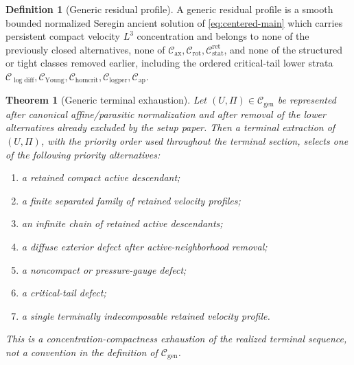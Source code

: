 \documentclass[11pt]{amsart}
\numberwithin{equation}{section}
\theoremstyle{plain}
\newtheorem{theorem}{Theorem}[section]
\theoremstyle{definition}
\newtheorem{definition}[definition]{Definition}
\theoremstyle{remark}
\newcommand{\Cax}{\mathcal C_{\mathrm{ax}}}
\newcommand{\Crot}{\mathcal C_{\mathrm{rot}}}
\newcommand{\Cstat}{\mathcal C_{\mathrm{stat}}^{\mathrm{ret}}}
\newcommand{\Cgen}{\mathcal C_{\mathrm{gen}}}
\newcommand{\Chomcrit}{\mathcal C_{\mathrm{homcrit}}}
\newcommand{\Clogper}{\mathcal C_{\mathrm{logper}}}
\newcommand{\Capcrit}{\mathcal C_{\mathrm{ap}}}
\newcommand{\Cyoung}{\mathcal C_{\mathrm{Young}}}
\newcommand{\Clogdiff}{\mathcal C_{\log\mathrm{diff}}}
\begin{document}
\begin{definition}[Generic residual profile]
\label{def:R4-profile-main}
A generic residual profile is a smooth bounded normalized Seregin ancient solution of
\eqref{eq:centered-main} which carries persistent compact velocity
\(L^3\) concentration and
belongs to none of the previously closed alternatives, none of
\(\Cax,\Crot,\Cstat\), and none of the structured or tight
classes removed earlier, including the ordered critical-tail lower strata
\(\Clogdiff,\Cyoung,\Chomcrit,\Clogper,\Capcrit\).
\end{definition}

\begin{theorem}[Generic terminal exhaustion]
\label{thm:generic-terminal-exhaustion}
Let \((U,\Pi)\in\Cgen\) be represented after canonical affine/parasitic
normalization and after removal of the lower alternatives already excluded by the setup paper.  Then a
terminal extraction of \((U,\Pi)\), with the priority order used throughout the
terminal section, selects one of the following priority alternatives:
\begin{enumerate}[label=\textup{(\arabic*)},leftmargin=2.2em]
   \item a retained compact active descendant;
   \item a finite separated family of retained velocity profiles;
   \item an infinite chain of retained active descendants;
   \item a diffuse exterior defect after active-neighborhood removal;
   \item a noncompact or pressure-gauge defect;
   \item a critical-tail defect;
   \item a single terminally indecomposable retained velocity profile.
\end{enumerate}
This is a concentration-compactness exhaustion of the realized terminal
sequence, not a convention in the definition of \(\Cgen\).
\end{theorem}
\end{document}
